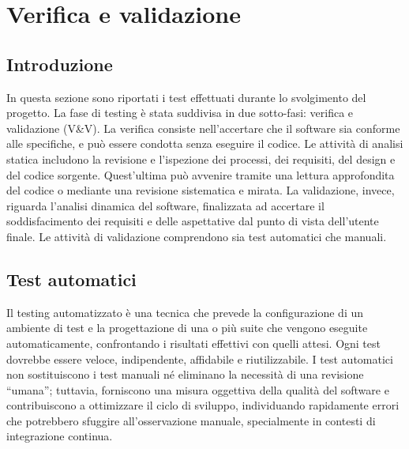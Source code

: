 \chapter{Verifica e validazione}
\label{cap:verifica-validazione}


\section{Introduzione}
\label{sec:introduzione-testing}

\par In questa sezione sono riportati i test effettuati durante lo svolgimento del progetto. La fase di testing è stata suddivisa in due sotto-fasi: verifica e validazione (V\&V). La verifica consiste nell’accertare che il software sia conforme alle specifiche, e può essere condotta senza eseguire il codice. Le attività di analisi statica includono la revisione e l’ispezione dei processi, dei requisiti, del design e del codice sorgente. Quest’ultima può avvenire tramite una lettura approfondita del codice o mediante una revisione sistematica e mirata. La validazione, invece, riguarda l’analisi dinamica del software, finalizzata ad accertare il soddisfacimento dei requisiti e delle aspettative dal punto di vista dell’utente finale. Le attività di validazione comprendono sia test automatici che manuali.


\section{Test automatici}

\par Il testing automatizzato è una tecnica che prevede la configurazione di un ambiente di test e la progettazione di una o più suite che vengono eseguite automaticamente, confrontando i risultati effettivi con quelli attesi. Ogni test dovrebbe essere veloce, indipendente, affidabile e riutilizzabile. I test automatici non sostituiscono i test manuali né eliminano la necessità di una revisione “umana”; tuttavia, forniscono una misura oggettiva della qualità del software e contribuiscono a ottimizzare il ciclo di sviluppo, individuando rapidamente errori che potrebbero sfuggire all’osservazione manuale, specialmente in contesti di integrazione continua.

